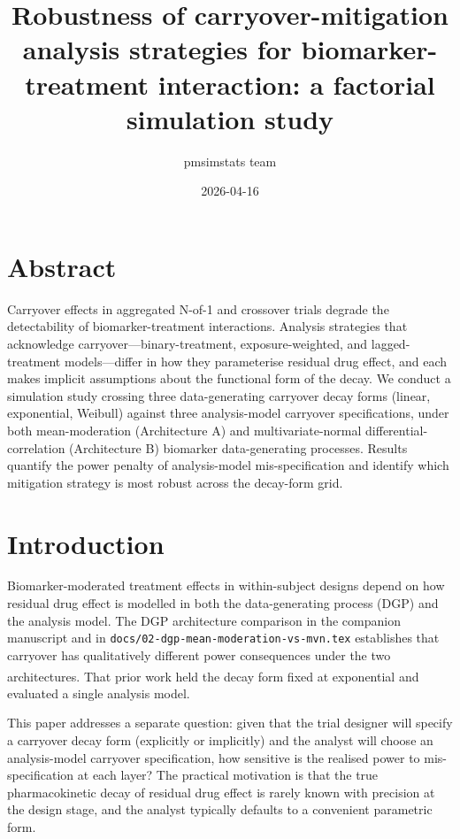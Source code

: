 \documentclass[
]{article}
\title{Robustness of carryover-mitigation analysis strategies for biomarker-treatment interaction: a factorial simulation study}
\author{pmsimstats team}
\date{2026-04-16}
\begin{document}
\maketitle

\section{Abstract}\label{abstract}

Carryover effects in aggregated N-of-1 and crossover trials degrade
the detectability of biomarker-treatment interactions. Analysis
strategies that acknowledge carryover---binary-treatment,
exposure-weighted, and lagged-treatment models---differ in how
they parameterise residual drug effect, and each makes implicit
assumptions about the functional form of the decay. We conduct a
simulation study crossing three data-generating carryover decay
forms (linear, exponential, Weibull) against three analysis-model
carryover specifications, under both mean-moderation (Architecture
A) and multivariate-normal differential-correlation (Architecture
B) biomarker data-generating processes. Results quantify the power
penalty of analysis-model mis-specification and identify which
mitigation strategy is most robust across the decay-form grid.

\section{Introduction}\label{introduction}

Biomarker-moderated treatment effects in within-subject designs
depend on how residual drug effect is modelled in both the
data-generating process (DGP) and the analysis model. The DGP
architecture comparison in the companion manuscript and in
\texttt{docs/02-dgp-mean-moderation-vs-mvn.tex} establishes that
carryover has qualitatively different power consequences under
the two architectures\textsuperscript{}. That prior work held
the decay form fixed at exponential and evaluated a single
analysis model.

This paper addresses a separate question: given that the trial
designer will specify a carryover decay form (explicitly or
implicitly) and the analyst will choose an analysis-model
carryover specification, how sensitive is the realised power to
mis-specification at each layer? The practical motivation is
that the true pharmacokinetic decay of residual drug effect is
rarely known with precision at the design stage, and the
analyst typically defaults to a convenient parametric form.
\end{document}
